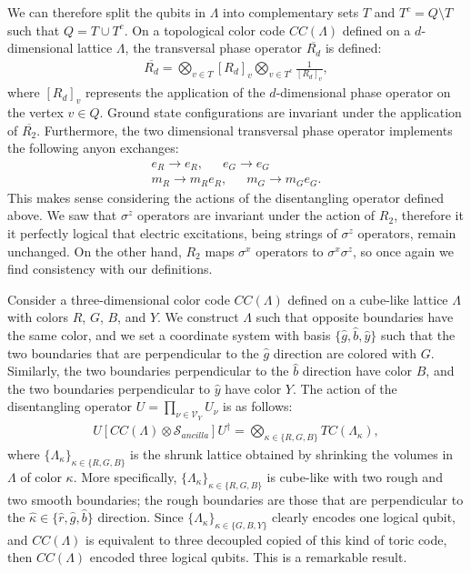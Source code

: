 \documentclass[12pt]{article}
\theoremstyle{definition}
\begin{document}
We can therefore split the qubits in $\Lambda$ into complementary sets $T$ and $T^c = Q\setminus T$ such that $Q = T\cup T^c$. On a topological color code $CC(\Lambda)$ defined on a $d$-dimensional lattice $\Lambda$, the transversal phase operator $\overline{R_d}$ is defined:
    \begin{align}
        \overline{R_d} = \bigotimes_{v\in T}[R_d]_v\bigotimes_{v\in T^c}\frac{1}{[R_d]_v},
    \end{align}
where $[R_d]_v$ represents the application of the $d$-dimensional phase operator on the vertex $v\in Q$. Ground state configurations are invariant under the application of $\overline{R_2}$. Furthermore, the two dimensional transversal phase operator implements the following anyon exchanges:
    \begin{align}
        e_R\rightarrow e_R,\enspace\enspace\enspace e_G\rightarrow e_G\\
        m_R\rightarrow m_Re_R,\enspace\enspace\enspace m_G\rightarrow m_Ge_G.
    \end{align}
This makes sense considering the actions of the disentangling operator defined above. We saw that $\sigma^z$ operators are invariant under the action of $R_2$, therefore it it perfectly logical that electric excitations, being strings of $\sigma^z$ operators, remain unchanged. On the other hand, $R_2$ maps $\sigma^x$ operators to $\sigma^x\sigma^z$, so once again we find consistency with our definitions.\newline

Consider a three-dimensional color code $CC(\Lambda)$ defined on a cube-like lattice $\Lambda$ with colors $R$, $G$, $B$, and $Y$. We construct $\Lambda$ such that opposite boundaries have the same color, and we set a coordinate system with basis $\{\hat{g}, \hat{b}, \hat{y}\}$ such that the two boundaries that are perpendicular to the $\hat{g}$ direction are colored with $G$. Similarly, the two boundaries perpendicular to the $\hat{b}$ direction have color $B$, and the two boundaries perpendicular to $\hat{y}$ have color $Y$. The action of the disentangling operator $U = \prod_{\nu\in\mathcal{V}_Y}U_\nu$ is as follows:
    \begin{align}
        U[CC(\Lambda)\otimes\mathcal{S}_{ancilla}]U^\dagger = \bigotimes_{\kappa\in\{R,G,B\}}TC(\Lambda_\kappa),
    \end{align}
where $\{\Lambda_\kappa\}_{\kappa\in\{R,G,B\}}$ is the shrunk lattice obtained by shrinking the volumes in $\Lambda$ of color $\kappa$. More specifically, $\{\Lambda_\kappa\}_{\kappa\in\{R,G,B\}}$ is cube-like with two rough and two smooth boundaries; the rough boundaries are those that are perpendicular to the $\hat{\kappa}\in\{\hat{r},\hat{g},\hat{b}\}$ direction. Since $\{\Lambda_\kappa\}_{\kappa\in\{G,B,Y\}}$ clearly encodes one logical qubit, and $CC(\Lambda)$ is equivalent to three decoupled copied of this kind of toric code, then $CC(\Lambda)$ encoded three logical qubits. This is a remarkable result.\newline
\end{document}
